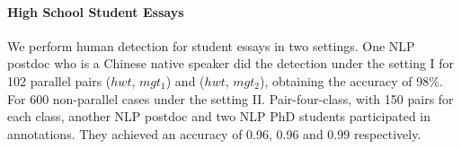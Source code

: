 


\paragraph{High School Student Essays}
We perform human detection for student essays in two settings.
One NLP postdoc who is a Chinese native speaker did the detection under the setting I for 102 parallel pairs ($hwt$, $mgt_1$) and ($hwt$, $mgt_2$), obtaining the accuracy of 98\%.
For 600 non-parallel cases under the setting II. Pair-four-class, with 150 pairs for each class, another NLP postdoc and two NLP PhD students participated in annotations. They achieved an accuracy of 0.96, 0.96 and 0.99 respectively. 

